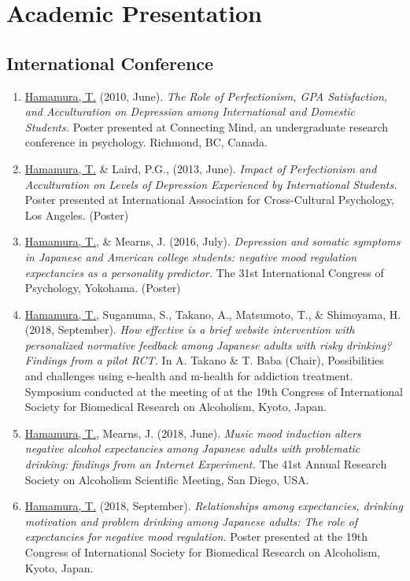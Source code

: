 \documentclass{article}
\begin{document}
\section{Academic Presentation}
\subsection{International Conference}
\begin{enumerate}
	\item \underline{Hamamura, T.} (2010, June). \textit{The Role of Perfectionism, GPA Satisfaction, and Acculturation on Depression among International and Domestic Students.} Poster presented at Connecting Mind, an undergraduate research conference in psychology. Richmond, BC, Canada.
	\item \underline{Hamamura, T.} \& Laird, P.G., (2013, June). \textit{Impact of Perfectionism and Acculturation on Levels of Depression Experienced by International Students.} Poster presented at International Association for Cross-Cultural Psychology, Los Angeles. (Poster)
	\item \underline{Hamamura, T.}, \& Mearns, J. (2016, July). \textit{Depression and somatic symptoms in Japanese and American college students: negative mood regulation expectancies as a personality predictor.} The 31st International Congress of Psychology, Yokohama. (Poster)
	\item \underline{Hamamura, T.}, Suganuma, S., Takano, A., Matsumoto, T., \& Shimoyama, H. (2018, September). \textit{How effective is a brief website intervention with personalized normative feedback among Japanese adults with risky drinking? Findings from a pilot RCT.} In A. Takano \& T. Baba (Chair), Possibilities and challenges using e-health and m-health for addiction treatment. Symposium conducted at the meeting of at the 19th Congress of International Society for Biomedical Research on Alcoholism, Kyoto, Japan.
	\item \underline{Hamamura, T.}, Mearns, J. (2018, June). \textit{Music mood induction alters negative alcohol expectancies among Japanese adults with problematic drinking: findings from an Internet Experiment.} The 41st Annual Research Society on Alcoholism Scientific Meeting, San Diego, USA.
	\item \underline{Hamamura, T.} (2018, September). \textit{Relationships among expectancies, drinking motivation and problem drinking among Japanese adults: The role of expectancies for negative mood regulation.} Poster presented at the 19th Congress of International Society for Biomedical Research on Alcoholism, Kyoto, Japan.

\end{enumerate}
\end{document}
